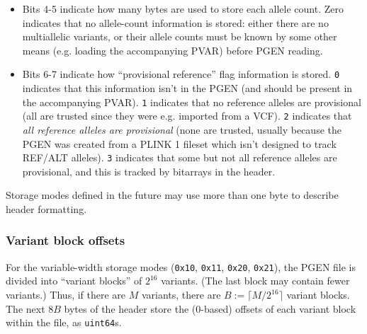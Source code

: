 \documentclass[8pt]{article}
\begin{document}
\begin{itemize}
\begin{itemize}
    \texttt{0x08}, length $W+v$.  9: record type \texttt{0x10}, length $W+1$.
    $v\in [10, 15]$: record type \texttt{0x18}, length $W+v-7$.  8 is
    invalid.
  \item \texttt{12}: 2 bits per entry, and $N$ must be 1.  2: record type
    \texttt{0x45}, length 2.  3: record type \texttt{0x40}, length 3.
  \item \texttt{14}: 4 bits per entry, and $N$ must be 1.  3: record type
    \texttt{0x10}, length 2.  4: record type \texttt{0x45}, length 2.  5:
    record type \texttt{0x40}, length 3.  12: record type \texttt{0xc5},
    length 4.  13: record type \texttt{0xc0}, length 5.  15: record type
    \texttt{0xe0}, length 7.  2, 6-11, and 14 are invalid.
  \end{itemize}
  Values 13 and 15 are reserved for future use.

  With storage modes \texttt{0x02..0x04}, these bits are always zeroed out,
  since it is unnecessary to store any additional variant-record type or length
  information.
  \item Bits 4-5 indicate how many bytes are used to store each allele count.
    Zero indicates that no allele-count information is stored: either there are
    no multiallelic variants, or their allele counts must be known by some
    other means (e.g. loading the accompanying PVAR) before PGEN reading.
  \item Bits 6-7 indicate how ``provisional reference'' flag information is
    stored.  \texttt{0} indicates that this information isn't in the PGEN (and
    should be present in the accompanying PVAR).  \texttt{1} indicates that
    no reference alleles are provisional (all are trusted since they were e.g.
    imported from a VCF).  \texttt{2} indicates that \textit{all reference
    alleles are provisional} (none are trusted, usually because the PGEN was
    created from a PLINK 1 fileset which isn't designed to track REF/ALT
    alleles).  \texttt{3} indicates that some but not all reference alleles are
    provisional, and this is tracked by bitarrays in the header.
\end{itemize}

Storage modes defined in the future may use more than one byte to describe
header formatting.

\subsubsection{Variant block offsets}

For the variable-width storage modes (\texttt{0x10}, \texttt{0x11},
\texttt{0x20}, \texttt{0x21}), the PGEN file is divided into ``variant blocks''
of $2^{16}$ variants.  (The last block may contain fewer variants.) Thus, if
there are $M$ variants, there are $B := \lceil M/2^{16}\rceil$ variant blocks.
The next $8B$ bytes of the header store the (0-based) offsets of each variant
block within the file, as \texttt{uint64}s.
\end{document}
